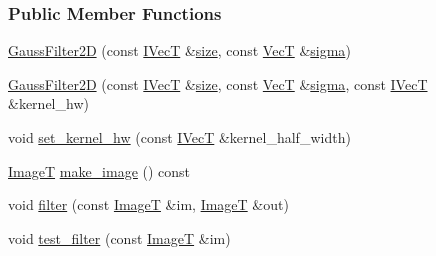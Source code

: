 \subsubsection*{Public Member Functions}
\begin{DoxyCompactItemize}
\item 
\hyperlink{classboxxer_1_1GaussFilter2D_a131316827df77a205e23788431778b75}{Gauss\+Filter2D} (const \hyperlink{classboxxer_1_1GaussFIRFilter_a0083c8c9ab6032dd458b4dc93852c2b8}{I\+VecT} \&\hyperlink{classboxxer_1_1GaussFIRFilter_ac0d4e19bb2be3e8913e77283e7e4317e}{size}, const \hyperlink{classboxxer_1_1GaussFilter2D_a43b1093b492791f308036e6729cf765e}{VecT} \&\hyperlink{classboxxer_1_1GaussFIRFilter_a66ced06c688fd544d5f1f8be39aa2125}{sigma})
\item 
\hyperlink{classboxxer_1_1GaussFilter2D_a37a89756c10a34ed6a5098520f8d7747}{Gauss\+Filter2D} (const \hyperlink{classboxxer_1_1GaussFIRFilter_a0083c8c9ab6032dd458b4dc93852c2b8}{I\+VecT} \&\hyperlink{classboxxer_1_1GaussFIRFilter_ac0d4e19bb2be3e8913e77283e7e4317e}{size}, const \hyperlink{classboxxer_1_1GaussFilter2D_a43b1093b492791f308036e6729cf765e}{VecT} \&\hyperlink{classboxxer_1_1GaussFIRFilter_a66ced06c688fd544d5f1f8be39aa2125}{sigma}, const \hyperlink{classboxxer_1_1GaussFIRFilter_a0083c8c9ab6032dd458b4dc93852c2b8}{I\+VecT} \&kernel\+\_\+hw)
\item 
void \hyperlink{classboxxer_1_1GaussFilter2D_a9829d0790d5d1b0931a09cb3e9afe07f}{set\+\_\+kernel\+\_\+hw} (const \hyperlink{classboxxer_1_1GaussFIRFilter_a0083c8c9ab6032dd458b4dc93852c2b8}{I\+VecT} \&kernel\+\_\+half\+\_\+width)
\item 
\hyperlink{classboxxer_1_1GaussFilter2D_ae23c8679409815813d371743d9645565}{ImageT} \hyperlink{classboxxer_1_1GaussFilter2D_a00c1d3d16f47a9293b79202d187938b8}{make\+\_\+image} () const 
\item 
void \hyperlink{classboxxer_1_1GaussFilter2D_aac5d338e756dcf5016653d93f6d05bd3}{filter} (const \hyperlink{classboxxer_1_1GaussFilter2D_ae23c8679409815813d371743d9645565}{ImageT} \&im, \hyperlink{classboxxer_1_1GaussFilter2D_ae23c8679409815813d371743d9645565}{ImageT} \&out)
\item 
void \hyperlink{classboxxer_1_1GaussFilter2D_a9bb46c4fc45f4658387e309253d4f12a}{test\+\_\+filter} (const \hyperlink{classboxxer_1_1GaussFilter2D_ae23c8679409815813d371743d9645565}{ImageT} \&im)
\end{DoxyCompactItemize}
